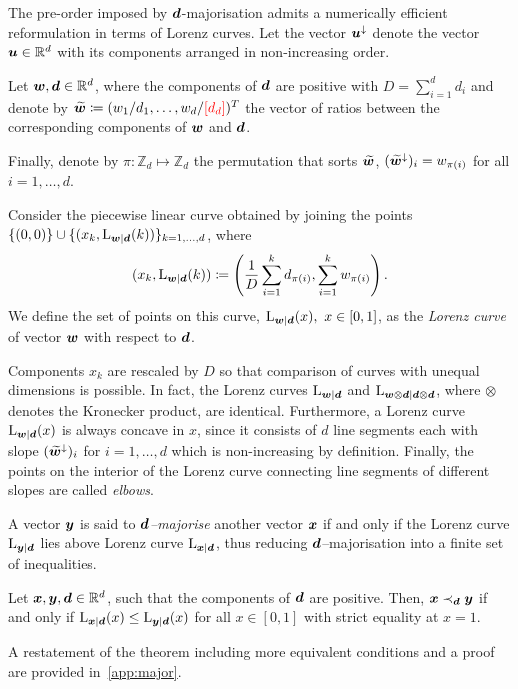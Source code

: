 \documentclass[pra,
aps,
twocolumn,
superscriptaddress,
groupedaddress,
nofootinbib,
reprint
]{revtex4-1}
\begin{document}
The pre-order imposed by $\bm{d}$-majorisation admits a numerically efficient reformulation in terms of Lorenz curves.
Let the vector $\bm{u}^\downarrow$ denote the vector $\bm{u} \in \mathbb{R}^d$ with its components arranged in non-increasing order.
\begin{definition}\label{def:lc}
    Let $\bm{w}, \bm{d} \in \mathbb{R}^d$, where the components of $\bm{d}$ are positive with $D = \sum_{i=1}^d d_i$ and denote by $\widetilde{\bm{w}} \coloneqq (w_1/d_1, \dots, w_d/{\color{red}[d_d]})^T$ the vector of ratios between the corresponding components of $\bm{w}$ and $\bm{d}$.
    
    Finally, denote by $\pi: \mathbb{Z}_d \mapsto \mathbb{Z}_d$ the permutation that sorts $\widetilde{\bm{w}}$, $(\widetilde{\bm{w}}^\downarrow)_i = w_{\pi(i)}$ for all $i=1,\dots,d$.
    
    Consider the piecewise linear curve obtained by joining the points $\{(0,0)\} \cup \{ (x_k, {{\rm{L}}_{\bm{w}|\bm{d}}}(k)) \}_{k=1,\dots,d}$, where
    \begin{equation}\label{eq:lorenz}
        (x_k, {{\rm{L}}_{\bm{w}|\bm{d}}}(k)) \coloneqq \left( \frac{1}{D}\sum_{i=1}^k d_{\pi(i)}, \sum_{i=1}^k w_{\pi(i)} \right).
    \end{equation}
    We define the set of points on this curve, ${{\rm{L}}_{\bm{w}|\bm{d}}}(x),\ x \in [0,1]$, as the \emph{Lorenz curve} of vector $\bm{w}$ with respect to $\bm{d}$.
\end{definition}
Components $x_k$ are rescaled by $D$ so that comparison of curves with unequal dimensions is possible.
In fact, the Lorenz curves ${{\rm{L}}_{\bm{w}|\bm{d}}}$ and ${{\rm{L}}_{\bm{w} \otimes \bm{d}|\bm{d} \otimes \bm{d}}}$, where $\otimes$ denotes the Kronecker product, are identical.
Furthermore, a Lorenz curve ${{\rm{L}}_{\bm{w}|\bm{d}}}(x)$ is always concave in $x$, since it consists of $d$ line segments each with slope $(\widetilde{\bm{w}}^\downarrow)_i$ for $i=1,\dots,d$ which is non-increasing by definition.
Finally, the points on the interior of the Lorenz curve connecting line segments of different slopes are called \emph{elbows}.

A vector $\bm{y}$ is said to \emph{$\bm{d}$--majorise} another vector $\bm{x}$ if and only if the Lorenz curve ${{\rm{L}}_{\bm{y}|\bm{d}}}$ lies above Lorenz curve ${{\rm{L}}_{\bm{x}|\bm{d}}}$, thus reducing $\bm{d}$--majorisation into a finite set of inequalities.
\begin{theorem}\label{thm:dmajor}
    Let $\bm{x}, \bm{y}, \bm{d} \in \mathbb{R}^d$, such that the components of $\bm{d}$ are positive. 
    Then, $\bm{x} \prec_{\bm{d}} \bm{y}$ if and only if ${{\rm{L}}_{\bm{x}|\bm{d}}}(x) \leq {{\rm{L}}_{\bm{y}|\bm{d}}}(x)$ for all $x \in [0,1]$ with strict equality at $x=1$.
\end{theorem}
A restatement of the theorem including more equivalent conditions and a proof are provided in~\cref{app:major}.
	
\end{document}
